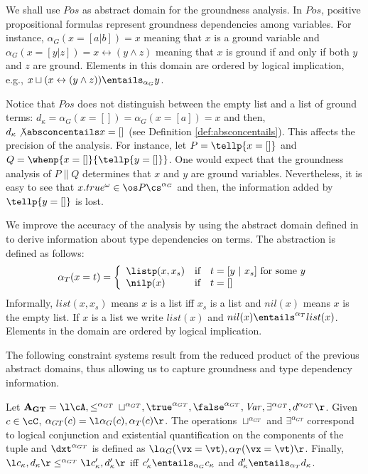 \documentclass{tlp}
\begin{document}
We shall use $Pos$ \cite{armstrong98two} as abstract domain for the groundness analysis.  In $Pos$, positive propositional formulas 
represent groundness dependencies among variables. 
  For instance, $\alpha_G(x=[a | b]) = x$ meaning that $x$ is a ground variable and $\alpha_G(x=[y | z]) = x \leftrightarrow (y \wedge z)$   meaning that    $x$ is ground if and only if both $y$ and $z$ are ground. 
Elements in this domain are ordered by logical implication, e.g., 
$x \sqcup (x \leftrightarrow (y \wedge z) )\entails_{\alpha_G} y$.



\begin{observation}
Notice that $Pos$ does not distinguish between the empty list and a list of ground terms:  $d_\kappa = \alpha_G(x=[]) = \alpha_G(x=[a]) = x$ and then,   $d_\kappa \not\absconcentails x=[]$ (see Definition \ref{def:absconcentails}).  This affects the precision of the analysis. For instance, let $
P=\tellp{x=[]}$ and $Q= \whenp{x=[]}{\tellp{y=[]}}
$. 
One would expect that the groundness analysis of $P \parallel Q$ determines that $x$ and $y$ are ground variables. Nevertheless, it is easy to see that  $x.true^\omega\in \os P\cs^{\alpha_G}$ and then, the information added by $\tellp{y=[]}$ is lost.
\end{observation}

We  improve the accuracy of the analysis by using the abstract domain defined in \cite{CodishD94} to derive information about type dependencies on terms. The abstraction is defined as follows:
\[
\alpha_{T}(x=t) = \left\{
\begin{array}{lll}
\listp(x,x_s) & \mbox{if} & t=[y \ |\  x_s] \mbox{ for some $y$}\\
\nilp(x) & \mbox{if} & t=[]
\end{array}
\right.
\]
Informally, $list(x,x_s)$ means $x$ is a list iff $x_s$ is a list and  $nil(x)$  means $x$ is the empty list. If $x$ is a list we write $list(x)$ and $nil(x) \entails^{\alpha_T} list(x)$. Elements in the domain are ordered by logical implication. 


The following constraint systems result from the reduced product  \cite{CC92} of the previous abstract domains, thus allowing us to capture groundness and type dependency information. 

\begin{definition} \label{def:gt-domain}
Let 
$
{\bf A_{GT}}=  \l \cA,\leq^{\alpha_{GT}}\, \sqcup^{\alpha_{GT}},\true^{\alpha_{GT}}, \false^{\alpha_{GT}}, {\it Var}, \exists^{\alpha_{GT}}, d^{\alpha_{GT}} \r
$. 
Given $c\in \cC$, $\alpha_{GT}(c) = \l \alpha_G(c) , \alpha_T(c) \r$. 
The operations $\sqcup^{\alpha_{GT}}$ and  $\exists^{\alpha_{GT}}$ 
correspond to logical conjunction and existential quantification on the components of the tuple and   $\dxt^{\alpha_{GT}}$ is defined as $\l \alpha_G(\vx=\vt), \alpha_T(\vx=\vt)\r$. 
Finally, $\l c_\kappa,d_\kappa\r \leq^{\alpha_{GT}}\l c_\kappa',d_\kappa'\r $ 
iff 
$c_\kappa' \entails_{\alpha_G} c_\kappa$ and $d_\kappa' \entails_{\alpha_T} d_\kappa$.
\end{definition}
\end{document}
